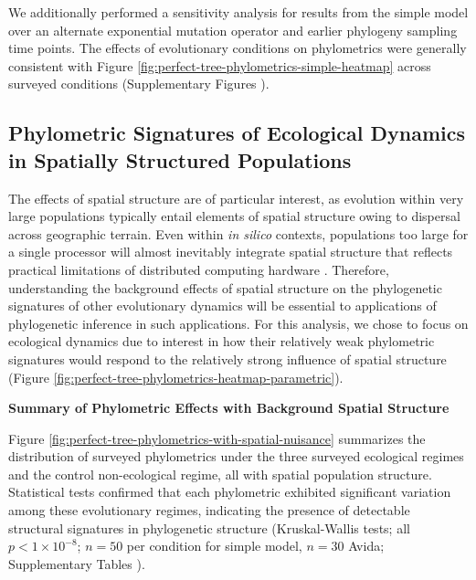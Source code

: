We additionally performed a sensitivity analysis for results from the simple model over an alternate exponential mutation operator and earlier phylogeny sampling time points.
The effects of evolutionary conditions on phylometrics were generally consistent with Figure \ref{fig:perfect-tree-phylometrics-simple-heatmap} across surveyed conditions (Supplementary Figures ).

\subsection{Phylometric Signatures of Ecological Dynamics in Spatially Structured Populations}



The effects of spatial structure are of particular interest, as evolution within very large populations typically entail elements of spatial structure owing to dispersal across geographic terrain.
Even within \textit{in silico} contexts, populations too large for a single processor will almost inevitably integrate spatial structure that reflects practical limitations of distributed computing hardware \citep{ackley2014indefinitely,moreno2021conduit}.
Therefore, understanding the background effects of spatial structure on the phylogenetic signatures of other evolutionary dynamics will be essential to applications of phylogenetic inference in such applications.
For this analysis, we chose to focus on ecological dynamics due to interest in how their relatively weak phylometric signatures would respond to the relatively strong influence of spatial structure (Figure \ref{fig:perfect-tree-phylometrics-heatmap-parametric}).

\noindent
\textbf{Summary of Phylometric Effects with Background Spatial Structure}



\noindent
Figure \ref{fig:perfect-tree-phylometrics-with-spatial-nuisance} summarizes the distribution of surveyed phylometrics under the three surveyed ecological regimes and the control non-ecological regime, all with spatial population structure.
Statistical tests confirmed that each phylometric exhibited significant variation among these evolutionary regimes, indicating the presence of detectable structural signatures in phylogenetic structure (Kruskal-Wallis tests; all $p < 1\times10^{-8}$; $n=50$ per condition for simple model, $n=30$ Avida; Supplementary Tables ).

